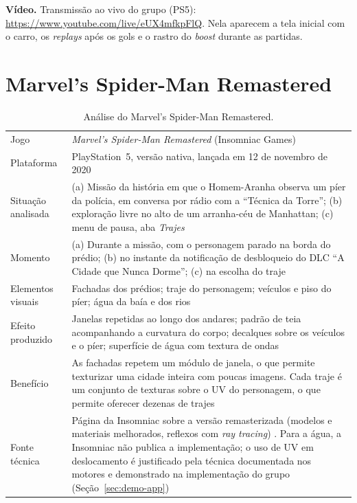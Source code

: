 \textbf{Vídeo.} Transmissão ao vivo do grupo (PS5): \url{https://www.youtube.com/live/eUX4mfkpFlQ}. Nela aparecem a tela inicial com o carro, os \textit{replays} após os gols e o rastro do \textit{boost} durante as partidas.

\section{Marvel's Spider-Man Remastered}

\begin{table}[H]
\centering
\caption{Análise do Marvel's Spider-Man Remastered.}
\label{tab:ficha-sm}
\small
\begin{tabular}{p{3.0cm}p{11.0cm}}
\toprule
Jogo & \textit{Marvel's Spider-Man Remastered} (Insomniac Games) \\
Plataforma & PlayStation~5, versão nativa, lançada em 12 de novembro de 2020 \cite{spidermanps} \\
Situação analisada & (a) Missão da história em que o Homem-Aranha observa um píer da polícia, em conversa por rádio com a ``Técnica da Torre''; (b) exploração livre no alto de um arranha-céu de Manhattan; (c) menu de pausa, aba \textit{Trajes} \\
Momento & (a) Durante a missão, com o personagem parado na borda do prédio; (b) no instante da notificação de desbloqueio do DLC ``A Cidade que Nunca Dorme''; (c) na escolha do traje \\
Elementos visuais & Fachadas dos prédios; traje do personagem; veículos e piso do píer; água da baía e dos rios \\
Efeito produzido & Janelas repetidas ao longo dos andares; padrão de teia acompanhando a curvatura do corpo; decalques sobre os veículos e o píer; superfície de água com textura de ondas \\
Benefício & As fachadas repetem um módulo de janela, o que permite texturizar uma cidade inteira com poucas imagens. Cada traje é um conjunto de texturas sobre o UV do personagem, o que permite oferecer dezenas de trajes \\
Fonte técnica & Página da Insomniac sobre a versão remasterizada (modelos e materiais melhorados, reflexos com \textit{ray tracing}) \cite{insomniac}. Para a água, a Insomniac não publica a implementação; o uso de UV em deslocamento é justificado pela técnica documentada nos motores \cite{unrealpanner,unitytiling} e demonstrado na implementação do grupo (Seção~\ref{sec:demo-app}) \\
\bottomrule
\end{tabular}
\end{table}


